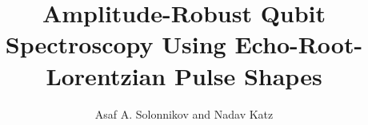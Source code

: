 \documentclass[
    amsfonts,
    amssymb,
    amsmath,
    reprint,
    floatfix,
    nofootinbib,
    aps,
    prl
]{revtex4-2}
\begin{document}
\title{Amplitude-Robust Qubit Spectroscopy Using Echo-Root-Lorentzian Pulse Shapes}

\author{Asaf A. Solonnikov and Nadav Katz}




\maketitle









\nocite{qm_opx1000_mwfem,qm_opx_demodulation,johansson_qutip2_2013}

\end{document}
